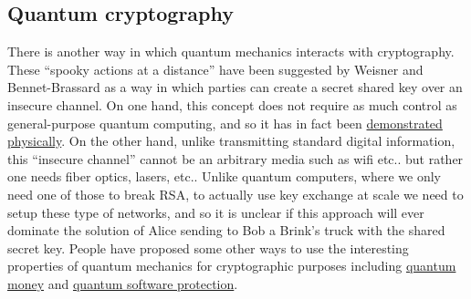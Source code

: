 \subsection{Quantum cryptography}\label{Quantum-cryptography}

There is another way in which quantum mechanics interacts with
cryptography. These ``spooky actions at a distance'' have been suggested
by Weisner and Bennet-Brassard as a way in which parties can create a
secret shared key over an insecure channel. On one hand, this concept
does not require as much control as general-purpose quantum computing,
and so it has in fact been
\href{https://en.wikipedia.org/wiki/Quantum_key_distribution\#Quantum_Key_Distribution_Networks}{demonstrated
physically}. On the other hand, unlike transmitting standard digital
information, this ``insecure channel'' cannot be an arbitrary media such
as wifi etc.. but rather one needs fiber optics, lasers, etc.. Unlike
quantum computers, where we only need one of those to break RSA, to
actually use key exchange at scale we need to setup these type of
networks, and so it is unclear if this approach will ever dominate the
solution of Alice sending to Bob a Brink's truck with the shared secret
key. People have proposed some other ways to use the interesting
properties of quantum mechanics for cryptographic purposes including
\href{https://en.wikipedia.org/wiki/Quantum_money}{quantum money} and
\href{http://www.scottaaronson.com/papers/noclone-ccc.pdf}{quantum
software protection}.
